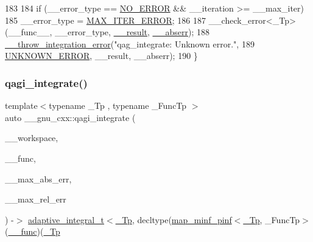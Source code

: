 \begin{DoxyCode}
183 
184       \textcolor{keywordflow}{if} (\_\_error\_type == \hyperlink{namespace____gnu__cxx_ad6c62dd86a596716cece6ac2d4cfd4b3ac31eecc280b10dec2efb4a2216ccc2e0}{NO\_ERROR} && \_\_iteration >= \_\_max\_iter)
185         \_\_error\_type = \hyperlink{namespace____gnu__cxx_ad6c62dd86a596716cece6ac2d4cfd4b3a420d46d10205dd953d0ccce5323afc4c}{MAX\_ITER\_ERROR};
186 
187       \_\_check\_error<\_Tp>(\_\_func\_\_, \_\_error\_type, \hyperlink{namespace____gnu__cxx_a500ea9f53aeaecd8c2ae657503450578}{\_\_result}, \hyperlink{namespace____gnu__cxx_a72f736cff127f1574e91a301de9e074b}{\_\_abserr});
188       \hyperlink{namespace____gnu__cxx_a2ae22137ca092b8ae10f4d42b4e32cfb}{\_\_throw\_integration\_error}(\textcolor{stringliteral}{"qag\_integrate: Unknown error."},
189                                 \hyperlink{namespace____gnu__cxx_ad6c62dd86a596716cece6ac2d4cfd4b3a7c57c614db2692fad0a19cb2ded33ed3}{UNKNOWN\_ERROR}, \_\_result, \_\_abserr);
190     \}
\end{DoxyCode}
\mbox{\label{namespace____gnu__cxx_a0425e6f64911ad03088ec405d47f6817}} 
\subsubsection{\texorpdfstring{qagi\+\_\+integrate()}{qagi\_integrate()}}
{\footnotesize\ttfamily template$<$typename \+\_\+\+Tp , typename \+\_\+\+Func\+Tp $>$ \\
auto \+\_\+\+\_\+gnu\+\_\+cxx\+::qagi\+\_\+integrate (\begin{DoxyParamCaption}\item[{\hyperlink{class____gnu__cxx_1_1integration__workspace}{integration\+\_\+workspace}$<$ \hyperlink{namespace____gnu__cxx_a3b19a9c800ca194374ef9172290f7d79}{\+\_\+\+Tp}, std\+::invoke\+\_\+result\+\_\+t$<$ \+\_\+\+Func\+Tp, \hyperlink{namespace____gnu__cxx_a3b19a9c800ca194374ef9172290f7d79}{\+\_\+\+Tp} $>$$>$ \&}]{\+\_\+\+\_\+workspace,  }\item[{\+\_\+\+Func\+Tp}]{\+\_\+\+\_\+func,  }\item[{\hyperlink{namespace____gnu__cxx_a3b19a9c800ca194374ef9172290f7d79}{\+\_\+\+Tp}}]{\+\_\+\+\_\+max\+\_\+abs\+\_\+err,  }\item[{\hyperlink{namespace____gnu__cxx_a3b19a9c800ca194374ef9172290f7d79}{\+\_\+\+Tp}}]{\+\_\+\+\_\+max\+\_\+rel\+\_\+err }\end{DoxyParamCaption}) -\/$>$ \hyperlink{struct____gnu__cxx_1_1adaptive__integral__t}{adaptive\+\_\+integral\+\_\+t}$<$\hyperlink{namespace____gnu__cxx_a3b19a9c800ca194374ef9172290f7d79}{\+\_\+\+Tp}, decltype(\hyperlink{struct____gnu__cxx_1_1map__minf__pinf}{map\+\_\+minf\+\_\+pinf}$<$\hyperlink{namespace____gnu__cxx_a3b19a9c800ca194374ef9172290f7d79}{\+\_\+\+Tp}, \+\_\+\+Func\+Tp$>$(\hyperlink{namespace____gnu__cxx_af2b2f0c7a2ae72b922b1afefae5a65b2}{\+\_\+\+\_\+func})(\hyperlink{namespace____gnu__cxx_a3b19a9c800ca194374ef9172290f7d79}{\+\_\+\+Tp}}

